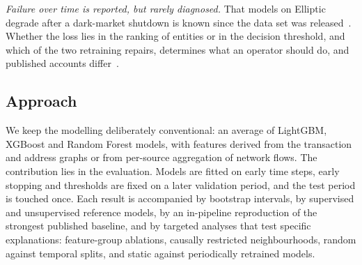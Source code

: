 \emph{Failure over time is reported, but rarely diagnosed.} That models on Elliptic degrade after a dark-market shutdown is known since the data set was released~\cite{weber2019}. Whether the loss lies in the ranking of entities or in the decision threshold, and which of the two retraining repairs, determines what an operator should do, and published accounts differ~\cite{bhatt2026}.

\subsection{Approach}
We keep the modelling deliberately conventional: an average of LightGBM, XGBoost and Random Forest models, with features derived from the transaction and address graphs or from per-source aggregation of network flows. The contribution lies in the evaluation. Models are fitted on early time steps, early stopping and thresholds are fixed on a later validation period, and the test period is touched once. Each result is accompanied by bootstrap intervals, by supervised and unsupervised reference models, by an in-pipeline reproduction of the strongest published baseline, and by targeted analyses that test specific explanations: feature-group ablations, causally restricted neighbourhoods, random against temporal splits, and static against periodically retrained models.

